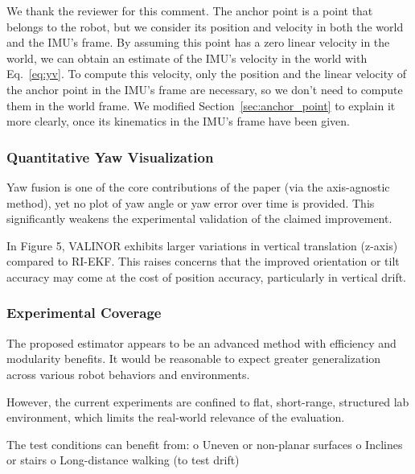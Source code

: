 We thank the reviewer for this comment. The anchor point is a point that belongs to the robot, but we consider its position and velocity in both the world and the IMU's frame. By assuming this point has a zero linear velocity in the world, we can obtain an estimate of the IMU's velocity in the world with Eq.~\eqref{eq:yv}. To compute this velocity, only the position and the linear velocity of the anchor point in the IMU's frame are necessary, so we don't need to compute them in the world frame. We modified Section~\ref{sec:anchor_point} to explain it more clearly, once its kinematics in the IMU's frame have been given.

\subsubsection{Quantitative Yaw Visualization}

\begin{revquote}
Yaw fusion is one of the core contributions of the paper (via the axis-agnostic method), yet no plot of yaw angle or yaw error over time is provided. This significantly weakens the experimental validation of the claimed improvement.
\end{revquote}

\begin{revquote}
In Figure 5, VALINOR exhibits larger variations in vertical translation (z-axis) compared to RI-EKF. This raises concerns that the improved orientation or tilt accuracy may come at the cost of position accuracy, particularly in vertical drift.
\end{revquote}

\subsubsection{Experimental Coverage}

\begin{revquote}
The proposed estimator appears to be an advanced method with efficiency and modularity benefits. It would be reasonable to expect greater generalization across various robot behaviors and environments.
\end{revquote}

\begin{revquote}
However, the current experiments are confined to flat, short-range, structured lab environment, which limits the real-world relevance of the evaluation.
\end{revquote}

\begin{revquote}
The test conditions can benefit from:
      o Uneven or non-planar surfaces
      o Inclines or stairs
      o Long-distance walking (to test drift)
\end{revquote}

